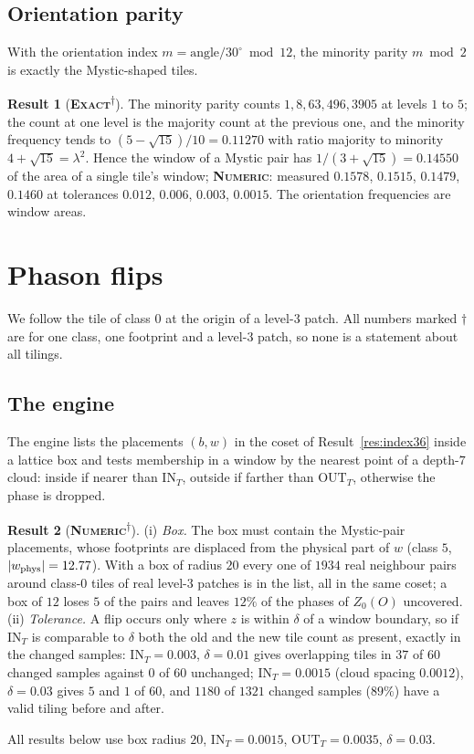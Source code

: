 \documentclass[11pt]{article}
\newcommand{\exact}{\textbf{\textsc{Exact}}}
\newcommand{\numeric}{\textbf{\textsc{Numeric}}}
\newcommand{\snap}{\textsuperscript{$\dagger$}}      %
\theoremstyle{definition}
\newtheorem{result}{Result}
\begin{document}
\subsection{Orientation parity}
With the orientation index $m=\text{angle}/30^\circ\bmod12$, the minority parity $m\bmod2$ is exactly the Mystic-shaped tiles.
\begin{result}[\exact\snap]\label{res:flip-parity}
The minority parity counts $1,8,63,496,3905$ at levels $1$ to $5$; the count at one level is the majority count at the previous one, and the minority frequency tends to $(5-\sqrt{15})/10=0.11270$ with ratio majority to minority $4+\sqrt{15}=\lambda^2$. Hence the window of a Mystic pair has $1/(3+\sqrt{15})=0.14550$ of the area of a single tile's window; \numeric: measured $0.1578$, $0.1515$, $0.1479$, $0.1460$ at tolerances $0.012$, $0.006$, $0.003$, $0.0015$. The orientation frequencies are window areas.
\end{result}

\section{Phason flips}\label{sec:flips}
We follow the tile of class $0$ at the origin of a level-$3$ patch. All numbers marked $\dagger$ are for one class, one footprint and a level-$3$ patch, so none is a statement about all tilings.

\subsection{The engine}\label{sec:flips-engine}
The engine lists the placements $(b,w)$ in the coset of Result~\ref{res:index36} inside a lattice box and tests membership in a window by the nearest point of a depth-$7$ cloud: inside if nearer than $\mathrm{IN}_T$, outside if farther than $\mathrm{OUT}_T$, otherwise the phase is dropped.
\begin{result}[\numeric\snap]\label{res:flip-engine}
(i) \emph{Box.} The box must contain the Mystic-pair placements, whose footprints are displaced from the physical part of $w$ (class $5$, $|w_{\rm phys}|=12.77$). With a box of radius $20$ every one of $1934$ real neighbour pairs around class-$0$ tiles of real level-$3$ patches is in the list, all in the same coset; a box of $12$ loses $5$ of the pairs and leaves $12\%$ of the phases of $Z_0(O)$ uncovered. (ii) \emph{Tolerance.} A flip occurs only where $z$ is within $\delta$ of a window boundary, so if $\mathrm{IN}_T$ is comparable to $\delta$ both the old and the new tile count as present, exactly in the changed samples: $\mathrm{IN}_T=0.003$, $\delta=0.01$ gives overlapping tiles in $37$ of $60$ changed samples against $0$ of $60$ unchanged; $\mathrm{IN}_T=0.0015$ (cloud spacing $0.0012$), $\delta=0.03$ gives $5$ and $1$ of $60$, and $1180$ of $1321$ changed samples ($89\%$) have a valid tiling before and after.
\end{result}
All results below use box radius $20$, $\mathrm{IN}_T=0.0015$, $\mathrm{OUT}_T=0.0035$, $\delta=0.03$.
\end{document}
